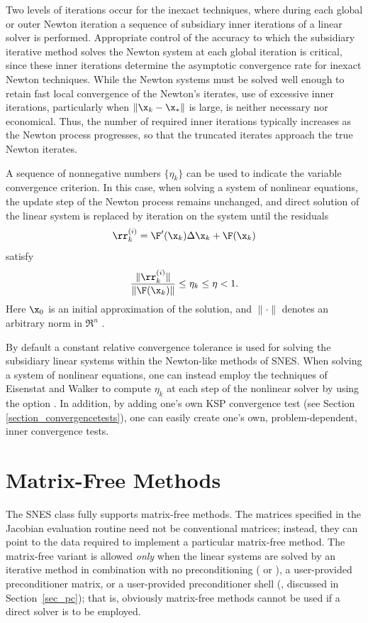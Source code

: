 Two levels of iterations occur for the inexact techniques, where 
during each global or outer Newton iteration a sequence of 
subsidiary inner iterations of a linear solver is performed.
Appropriate control of the accuracy to which the subsidiary 
iterative method solves the Newton system
at each global iteration is critical, since these 
inner iterations determine the asymptotic convergence rate for 
inexact Newton techniques.
While the Newton systems must be solved well enough to retain
fast local convergence of the Newton's iterates, use of excessive
inner iterations, particularly when $ \| \x_k - \x_* \| $ is large,
is neither necessary nor economical.
Thus, the number of required inner iterations typically increases
as the Newton process progresses, so that the truncated iterates
approach the true Newton iterates.

A sequence of nonnegative numbers $ \{\eta_k\} $ can be used to 
indicate the variable convergence criterion.
In this case, when solving a system of nonlinear equations, the 
update step of the Newton process remains unchanged, and direct 
solution of the linear system is replaced by iteration on the 
system until the residuals
\[  \rr_k^{(i)} =  \F'(\x_k) \Delta \x_k + \F(\x_k) \]
satisfy
\[  \frac{ \| \rr_k^{(i)} \| }{ \| \F(\x_k) \| } \leq \eta_k \leq \eta < 1. \]
Here $ \x_0 $ is an initial approximation of the solution, and
$ \| \cdot \| $ denotes an arbitrary norm in $ \Re^n $ .  

By default a constant relative convergence tolerance is used for
solving the subsidiary linear systems within the Newton-like methods
of SNES.  When solving a system of nonlinear equations, one can
instead employ the techniques of Eisenstat and Walker \cite{ew94}
to compute $ \eta_k $ at each step of the nonlinear solver by using the
option  . In addition,
by adding one's own KSP convergence test (see Section 
\ref{section_convergencetests}), one can easily create one's own,
problem-dependent, inner convergence tests. 

\section{Matrix-Free Methods}
\label{sec_nlmatrixfree}

The SNES class fully supports matrix-free methods. The matrices specified in the
Jacobian evaluation routine need not be conventional
matrices; instead, they can point to the data required to implement a
particular matrix-free method.  The matrix-free variant is allowed
{\em only} when the linear systems are solved by an iterative method
in combination with no preconditioning ( or  ),
a user-provided preconditioner matrix, or a user-provided preconditioner
shell (, discussed in Section~\ref{sec_pc}); that is,
obviously matrix-free methods cannot be used if a direct solver is to 
be employed.  

